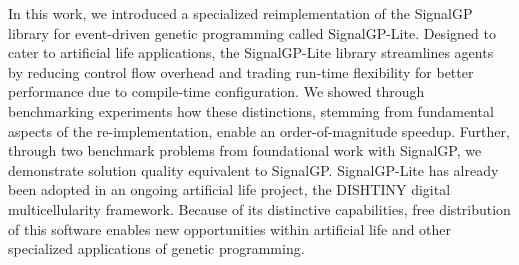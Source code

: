 In this work, we introduced a specialized reimplementation of the SignalGP library for event-driven genetic programming called SignalGP-Lite.
Designed to cater to artificial life applications, the SignalGP-Lite library streamlines agents by reducing control flow overhead and trading run-time flexibility for better performance due to compile-time configuration.
We showed through benchmarking experiments how these distinctions, stemming from fundamental aspects of the re-implementation, enable an order-of-magnitude speedup.
Further, through two benchmark problems from foundational work with SignalGP, we demonstrate solution quality equivalent to SignalGP.
SignalGP-Lite has already been adopted in an ongoing artificial life project, the DISHTINY digital multicellularity framework.
Because of its distinctive capabilities, free distribution of this software enables new opportunities within artificial life and other specialized applications of genetic programming.
